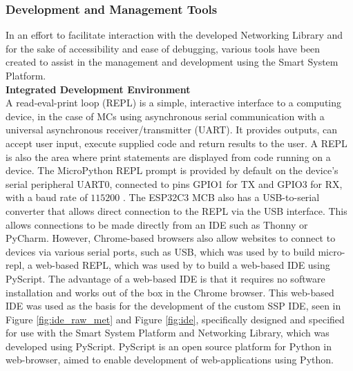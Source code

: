 \subsubsection{\label{sec:methods_pyscript}Development and Management Tools}

In an effort to facilitate interaction with the developed Networking Library and for the sake of accessibility and ease of debugging, various tools have been created to assist in the management and development using the Smart System Platform.\\

\textbf{\label{sec:methods_ide}Integrated Development Environment}\\

A read-eval-print loop (REPL) is a simple, interactive interface to a computing device, in the case of MCs using asynchronous serial communication with a universal asynchronous receiver/transmitter (UART). It provides outputs, can accept user input, execute supplied code and return results to the user. A REPL is also the area where print statements are displayed from code running on a device. The MicroPython REPL prompt is provided by default on the device's serial peripheral UART0, connected to pins GPIO1 for TX and GPIO3 for RX, with a baud rate of $115200$ \citep{micropython_micropython_2025}. The ESP32C3 MCB also has a USB-to-serial converter that allows direct connection to the REPL via the USB interface. This allows connections to be made directly from an IDE such as Thonny or PyCharm. However, Chrome-based browsers also allow websites to connect to devices via various serial ports, such as USB, which was used by \citet{webreflection_micro-repl_nodate} to build micro-repl, a web-based REPL, which was used by \citet[]{rogers_serial_nodate} to build a web-based IDE using PyScript. The advantage of a web-based IDE is that it requires no software installation and works out of the box in the Chrome browser. This web-based IDE was used as the basis for the development of the custom SSP IDE, seen in Figure \ref{fig:ide_raw_met} and Figure \ref{fig:ide}, specifically designed and specified for use with the Smart System Platform and Networking Library, which was developed using PyScript. PyScript is an open source platform for Python in web-browser, aimed to enable development of web-applications using Python. \citep{anaconda_inc_pyscript_2025,anaconda_inc_pyscript_nodate,anaconda_inc_pyscriptnet_nodate}

